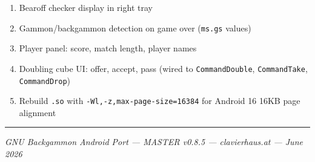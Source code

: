 \documentclass[11pt,a4paper]{article}
\providecommand{\tightlist}{\setlength{\itemsep}{2pt}\setlength{\parskip}{0pt}}
\begin{document}
\begin{enumerate}
\def\labelenumi{\arabic{enumi}.}
\tightlist
\item
  Bearoff checker display in right tray
\item
  Gammon/backgammon detection on game over (\texttt{ms.gs} values)
\item
  Player panel: score, match length, player names
\item
  Doubling cube UI: offer, accept, pass (wired to \texttt{CommandDouble},
  \texttt{CommandTake}, \texttt{CommandDrop})
\item
  Rebuild \texttt{.so} with \texttt{-Wl,-z,max-page-size=16384} for
  Android 16 16KB page alignment
\end{enumerate}

\begin{center}\rule{0.5\linewidth}{0.5pt}\end{center}

\emph{GNU Backgammon Android Port --- MASTER v0.8.5 --- clavierhaus.at
--- June 2026}
\end{document}
